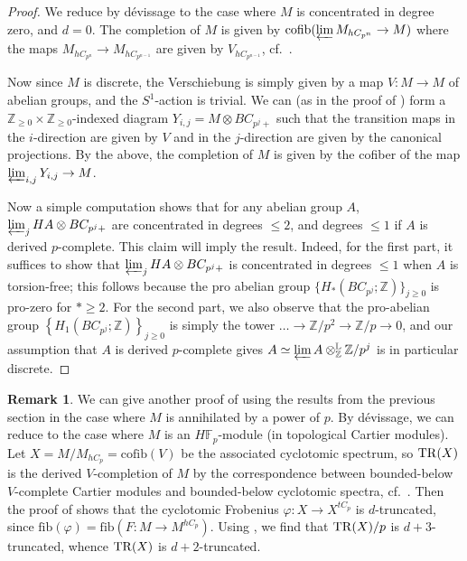 \documentclass{amsart}
\theoremstyle{definition}
\newtheorem{remark}[theorem]{Remark}
\begin{document}
\begin{proof} 
We reduce by d\'evissage to the case where $M$ is  concentrated in degree zero, 
and $d = 0$. 
The completion of $M$  is given by 
$\mathrm{cofib}( \varprojlim M_{hC_{p^n}} \to M)$ where the maps 
$M_{hC_{p^n}} \to M_{hC_{p^{n-1}}}$ are given by $V_{hC_{p^{n-1}}}$,
cf.~\cite[Prop.~3.22]{AN}. 

Now since $M$ is discrete, the Verschiebung is simply given by
a map $V\colon  M \to M$ of abelian groups, and the $S^1$-action is trivial. 
We can (as in the proof of \cite[Lem.~3.25]{AN}) 
form a $\mathbb{Z}_{\geq 0} \times \mathbb{Z}_{\geq 0}$-indexed
diagram
$Y_{i, j} = M \otimes BC_{p^j + }$ such that the transition maps in the 
$i$-direction are given by $V$ and in the $j$-direction are given by the
canonical projections. 
By the above, the completion of $M$ is given by the cofiber of the
map $\varprojlim_{i, j} Y_{i, j} \to M$. 

Now a simple computation shows that for any abelian group $A$, $\varprojlim_{j}
HA\otimes
BC_{p^j + }$ are concentrated in degrees $\leq 2$, and degrees $\leq  1$ if $A$
is derived $p$-complete. This claim will imply the result.  
Indeed, for the first part, it suffices to show that 
$\varprojlim_{j}
HA\otimes
BC_{p^j + }$
is concentrated in degrees $\leq 1$ when $A$ is torsion-free; this 
follows  because the pro abelian group $\{H_*(BC_{p^j};
\mathbb{Z}) \}_{j \geq 0} $ is pro-zero for $\ast \geq 2$. 
For the second part, we also observe that the pro-abelian group
$\left\{H_1( BC_{p^j}; \mathbb{Z})\right\}_{j \geq 0}$ is simply the tower
$\dots \to \mathbb{Z}/p^2  \to \mathbb{Z}/p \to 0$, 
and 
our assumption that $A$ is derived $p$-complete gives
$A \simeq \varprojlim A \otimes^{\mathbb{L}}_{\mathbb{Z}} \mathbb{Z}/p^j$
is in particular discrete. 
\end{proof} 


\begin{remark} 
We can give another proof of  using 
the results from the previous section in the case where $M$ is annihilated by a
power of $p$. By d\'evissage, we can reduce to the case where $M$ is an
$H\mathbb{F}_p$-module (in topological Cartier modules). 
Let $X = M/M_{hC_p} = \mathrm{cofib}(V)$ be the associated cyclotomic spectrum, so $\mathrm{TR}(X)$ is the derived
$V$-completion of $M$ by the correspondence between bounded-below $V$-complete
Cartier modules and bounded-below cyclotomic spectra, cf.~\cite[Th.~3.21]{AN}. 
Then the proof of  shows that 
the cyclotomic Frobenius
$\varphi\colon  X \to X^{tC_p}$ is $d$-truncated, since $\mathrm{fib}(\varphi) =
\mathrm{fib}(F\colon  M \to M^{hC_p})$. 
Using , 
we find that $\mathrm{TR}(X)/p$ is $d+3$-truncated, whence $\mathrm{TR}(X)$ is $d+2$-truncated. 

\end{remark} 
\end{document}
